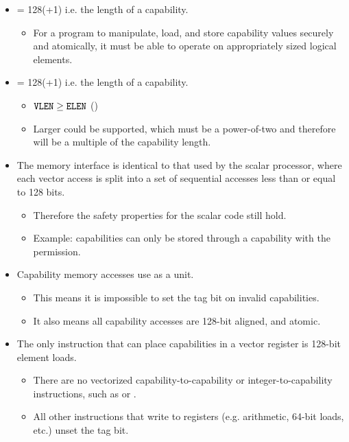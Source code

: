 \begin{itemize}
    \item {} = 128(+1) i.e. the length of a capability.
    \begin{itemize}
        \item For a program to manipulate, load, and store capability values securely and atomically, it must be able to operate on appropriately sized logical elements.
    \end{itemize}
    \item {} = 128(+1) i.e. the length of a capability.
    \begin{itemize}
        \item ${\texttt{VLEN}} \ge {\texttt{ELEN}}$ (\cite[Chapter~2]{specification-RVV-v1.0})
        \item Larger  could be supported, which must be a power-of-two\cite[Chapter~2]{specification-RVV-v1.0} and therefore will be a multiple of the capability length.
    \end{itemize}
    \item The memory interface is identical to that used by the scalar processor, where each vector access is split into a set of sequential accesses less than or equal to 128 bits.
    \begin{itemize}
        \item Therefore the safety properties for the scalar code still hold.
        \item Example: capabilities can only be stored through a capability with the  permission.
    \end{itemize}
    \item Capability memory accesses use  as a unit.
    \begin{itemize}
        \item This means it is impossible to set the tag bit on invalid capabilities.
        \item It also means all capability accesses are 128-bit aligned, and atomic.
    \end{itemize}
    \pagebreak
    \item The only instruction that can place capabilities in a vector register is 128-bit element loads.
    \begin{itemize}
        \item There are no vectorized capability-to-capability or integer-to-capability instructions, such as  or .
        \item All other instructions that write to registers (e.g. arithmetic, 64-bit loads, etc.) unset the tag bit.

\end{itemize}
\end{itemize}
